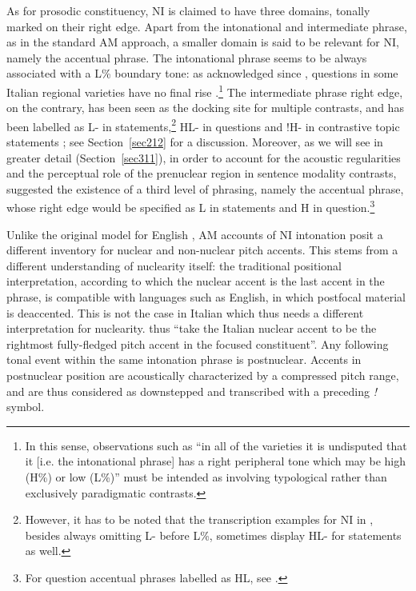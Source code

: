 As for prosodic constituency, NI is claimed to have three domains, tonally marked on their right edge. Apart from the intonational and intermediate phrase, as in the standard AM approach, a smaller domain is said to be relevant for NI, namely the accentual phrase. The intonational phrase seems to be always associated with a L\% boundary tone: as acknowledged since \citet{grice1991intonation}, questions in some Italian regional varieties have no final rise \citep{savino2012intonation}.\footnote{In this sense, observations such as ``in all of the varieties it is undisputed that it [i.e. the intonational phrase] has a right peripheral tone which may be high (H\%) or low (L\%)'' \cite[373]{grice2005strategy} must be intended as involving typological rather than exclusively paradigmatic contrasts.} The intermediate phrase right edge, on the contrary, has been seen as the docking site for multiple contrasts, and has been labelled as L- in statements,\footnote{However, it has to be noted that the transcription examples for NI in \citet{grice2005strategy}, besides always omitting L- before L\%, sometimes display HL- for statements as well.} HL- in questions \citep{dimperio2001focus} and !H- in contrastive topic statements \citep{dimperio2011phrasing}; see Section~\ref{sec212} for a discussion. Moreover, as we will see in greater detail (Section~\ref{sec311}), in order to account for the acoustic regularities and the perceptual role of the prenuclear region in sentence modality contrasts, \citet{petrone2011tones} suggested the existence of a third level of phrasing, namely the accentual phrase, whose right edge would be specified as L in statements and H in question.\footnote{For question accentual phrases labelled as HL, see \citet{petrone2008tonal}.}

Unlike the original model for English \citep{pierrehumbert1980phonology}, AM accounts of NI intonation posit a different inventory for nuclear and non-nuclear pitch accents. This stems from a different understanding of nuclearity itself: the traditional positional interpretation, according to which the nuclear accent is the last accent in the phrase, is compatible with languages such as English, in which postfocal material is deaccented. This is not the case in Italian \citep{swerts1999reaccentuation} which thus needs a different interpretation for nuclearity. \citet[380]{grice2005strategy} thus ``take the Italian nuclear accent to be the rightmost fully-fledged pitch accent in the focused constituent''. Any following tonal event within the same intonation phrase is postnuclear. Accents in postnuclear position are acoustically characterized by a compressed pitch range, and are thus considered as downstepped and transcribed with a preceding \textit{!} symbol.

